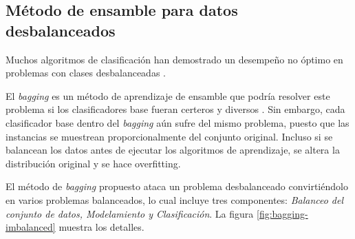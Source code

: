 
\subsection{Método de ensamble para datos desbalanceados}


Muchos algoritmos de clasificación han demostrado un desempeño no óptimo en problemas con clases desbalanceadas \citep{batista2004study, mani2003knn, seiffert2010rusboost}.

El \textit{bagging} es un método de aprendizaje de ensamble que podría resolver este problema si los clasificadores base fueran certeros y diversos \citep{breiman1996bagging}. Sin embargo, cada clasificador base dentro del \textit{bagging} aún sufre del mismo problema, puesto que las instancias se muestrean proporcionalmente del conjunto original. Incluso si se balancean los datos antes de ejecutar los algoritmos de aprendizaje, se altera la distribución original y se hace overfitting.

El método de \textit{bagging} propuesto \citep{sun2015novel} ataca un problema desbalanceado convirtiéndolo en varios problemas balanceados, lo cual incluye tres componentes: \textit{Balanceo del conjunto de datos, Modelamiento y Clasificación}. La figura \ref{fig:bagging-imbalanced} muestra los detalles.

